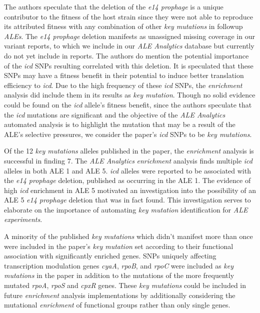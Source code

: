 \documentclass[12pt,final,masters,chapterheads]{ucsd}  %
\begin{document}
The authors speculate that the deletion of the \textit{e14 prophage} is a unique contributor to the fitness of the host strain since they were not able to reproduce its attributed fitness with any combination of other \textit{key mutations} in followup \textit{ALEs}. The \textit{e14 prophage} deletion manifests as unassigned missing coverage in our variant reports, to which we include in our \textit{ALE Analytics} database but currently do not yet include in reports. The authors do mention the potential importance of the \textit{icd} SNPs resulting correlated with this deletion. It is speculated that these SNPs may have a fitness benefit in their potential to induce better translation efficiency to \textit{icd}. Due to the high frequency of these \textit{icd} SNPs, the \textit{enrichment} analysis did include them in its results as \textit{key mutation}. Though no solid evidence could be found on the \textit{icd} allele's fitness benefit, since the authors speculate that the \textit{icd} mutations are significant and the objective of the \textit{ALE Analytics} automated analysis is to highlight the mutation that may be a result of the ALE's selective pressures, we consider the paper's \textit{icd} SNPs to be \textit{key mutations}.

Of the 12 \textit{key mutations} alleles published in the paper, the \textit{enrichment} analysis is successful in finding 7. The \textit{ALE Analytics} \textit{enrichment} analysis finds multiple \textit{icd} alleles in both ALE 1 and ALE 5. \textit{icd} alleles were reported to be associated with the \textit{e14 prophage } deletion, published as occurring in the ALE 1. The evidence of high \textit{icd} enrichment in ALE 5 motivated an investigation into the possibility of an ALE 5 \textit{e14 prophage} deletion that was in fact found. This investigation serves to elaborate on the importance of automating \textit{key mutation} identification for \textit{ALE experiments}.

A minority of the published \textit{key mutations} which didn't manifest more than once were included in the paper's \textit{key mutation} set according to their functional association with significantly enriched genes. SNPs uniquely affecting transcription modulation genes \textit{cyaA}, \textit{rpoB}, and \textit{rpoC} were included as \textit{key mutations} in the paper in addition to the mutations of the more frequently mutated \textit{rpoA}, \textit{rpoS} and \textit{cpxR} genes. These \textit{key mutations} could be included in future \textit{enrichment} analysis implementations by additionally considering the mutational \textit{enrichment} of functional groups rather than only single genes.
\end{document}
